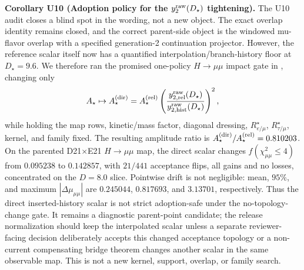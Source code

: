 \documentclass[aps,prd,onecolumn,notitlepage,nofootinbib,superscriptaddress,11pt,floatfix]{revtex4-2}
\begin{document}
\medskip\noindent\textbf{Corollary U10 (Adoption policy for the \texorpdfstring{$y_2^{\rm raw}(D_\star)$}{y2raw(D*)} tightening).}
The U10 audit closes a blind spot in the wording, not a new object.  The exact overlap identity remains closed, and the correct parent-side object is the windowed mu-flavor overlap with a specified generation-2 continuation projector.  However, the reference scalar itself now has a quantified interpolation/branch-history floor at \(D_\star=9.6\).  We therefore ran the promised one-policy \(H\to\mu\mu\) impact gate in , changing only
\[
A_\star\mapsto
A_\star^{\rm(dir)}
=
A_\star^{\rm(rel)}
\left(
\frac{y_{2,{\rm rel}}^{\rm raw}(D_\star)}
     {y_{2,{\rm hist}}^{\rm raw}(D_\star)}
\right)^2,
\]
while holding the map rows, kinetic/mass factor, diagonal dressing, \(R_{e/\mu}^\star\), \(R_{\tau/\mu}^\star\), kernel, and family fixed.  The resulting amplitude ratio is \(A_\star^{\rm(dir)}/A_\star^{\rm(rel)}=0.810203\).  On the parented D21\(\times\)E21 \(H\to\mu\mu\) map, the direct scalar changes \(f(\chi^2_{\mu\mu}\le4)\) from \(0.095238\) to \(0.142857\), with \(21/441\) acceptance flips, all gains and no losses, concentrated on the \(D=8.0\) slice.  Pointwise drift is not negligible: mean, \(95\%\), and maximum \(|\Delta\mu_{\mu\mu}|\) are \(0.245044\), \(0.817693\), and \(3.13701\), respectively.  Thus the direct inserted-history scalar is not strict adoption-safe under the no-topology-change gate.  It remains a diagnostic parent-point candidate; the release normalization should keep the interpolated scalar unless a separate reviewer-facing decision deliberately accepts this changed acceptance topology or a non-current compensating bridge theorem changes another scalar in the same observable map.  This is not a new kernel, support, overlap, or family search.
\end{document}
